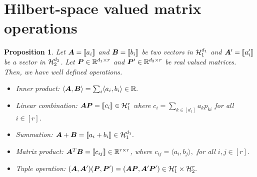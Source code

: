 \documentclass[12pt]{article}
\newtheorem{prop}{Proposition}
\begin{document}
\section{Hilbert-space valued matrix operations}
\begin{prop}
    Let $\bm A = \llbracket a_{i} \rrbracket$ and $\bm B = \llbracket b_{i} \rrbracket$ be two vectors in $\mathcal{H}_1^{d_1}$ and $\bm A' = \llbracket a'_{i} \rrbracket$ be a vector in $\mathcal{H}_2^{d_2}$.  Let $\bm{P}\in\mathbb{R}^{d_1\times r}$ and $\bm{P}'\in\mathbb{R}^{d_2\times r}$ be real valued matrices. Then, we have well defined operations.
    \begin{itemize}
    \item Inner product: $ \langle \bm A,\bm B \rangle = \sum_{i}\langle a_{i},b_{i}\rangle\in\mathbb{R}.$
    \item Linear combination: $\bm A\bm{P} = \llbracket c_{i} \rrbracket\in\mathcal{H}_1^{r}$ where $c_{i} = \sum_{k\in[d_1]}a_{k}p_{ki}$ for all $i\in[r]$.
    \item Summation:  $\bm A+\bm B = \llbracket a_{i}+b_{i} \rrbracket\in\mathcal{H}_1^{d_1}.$
    \item Matrix product: $\bm A^T\bm B = \llbracket c_{ij} \rrbracket\in\mathbb{R}^{r\times r}$, where $c_{ij} = \langle a_{i},b_{j}\rangle,$ for all $i,j\in[r].$ 
    \item Tuple operation: $(\bm A,\bm A')(\bm{P},\bm{P}') =(\bm A\bm{P},\bm A'\bm{P}')\in \mathcal{H}_1^r\times \mathcal{H}_2^r. $
\end{itemize}
\end{prop}





\end{document}
